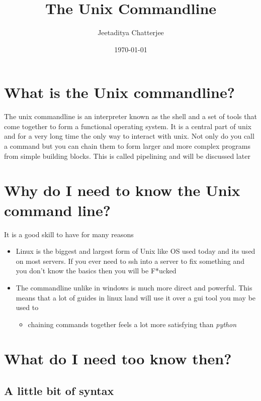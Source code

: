 \documentclass[a4paper]{article}
\author{Jeetaditya Chatterjee}
\date{\today}
\title{The Unix Commandline}
\begin{document}
\maketitle

\section*{What is the Unix commandline?}
\label{sec:orge4c6621}
\begin{notes}
	The unix commandline is an interpreter known as the shell and a set of tools that come together to
	form a functional operating system. It is a central part of unix and for a very
	long time the only way to interact with unix. Not only do you call a command but you can
	chain them to form larger and more complex programs from simple building blocks.
	This is called pipelining and will be discussed later
\end{notes}

\section*{Why do I need to know the Unix command line?}
\label{sec:orgcf02e17}
\begin{notes}
	It is a good skill to have for many reasons
	\begin{itemize}
		\item Linux is the biggest and largest form of Unix like OS used today and its used
		      on most servers. If you ever need to ssh into a server to fix something and
		      you don't know the basics then you will be F*ucked
		\item The commandline unlike in windows is much more direct and powerful. This means
		      that a lot of guides in linux land will use it over a gui tool you may be used to
		      \begin{itemize}
			      \item chaining commands together feels a lot more satisfying than \emph{python}
		      \end{itemize}
	\end{itemize}
\end{notes}

\section*{What do I need too know then?}
\label{sec:org6a91b3b}
\subsection*{A little bit of syntax}
\label{sec:org9bddc09}
\end{document}
